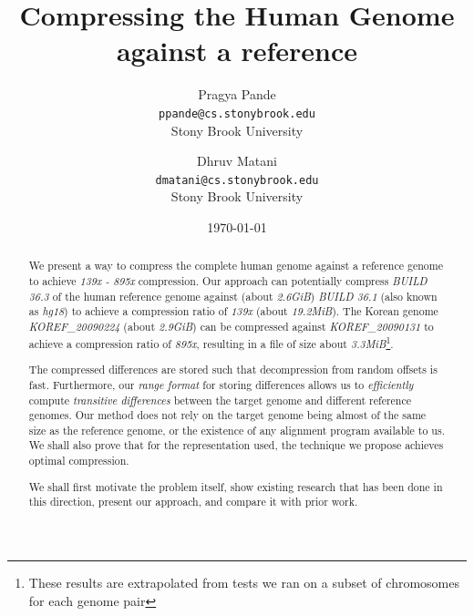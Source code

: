 \documentclass[11pt]{article}
\begin{document}
\title{Compressing the Human Genome against a reference}
\author{Pragya Pande\\\texttt{\small{ppande@cs.stonybrook.edu}}\\\small{Stony Brook University} \and 
  Dhruv Matani\\\texttt{\small{dmatani@cs.stonybrook.edu}}\\\small{Stony Brook University}
}
\date{\today}

\maketitle

\vspace{0.5in}

\begin{abstract}
  We present a way to compress the complete human genome against a
  reference genome to achieve \textit{139x - 895x} compression. Our
  approach can potentially compress \textit{BUILD 36.3} of the human
  reference genome against (about \textit{2.6GiB}) \textit{BUILD 36.1}
  (also known as \textit{hg18}) to achieve a compression ratio of
  \textit{139x} (about \textit{19.2MiB}). The Korean genome
  \textit{KOREF\_20090224} (about \textit{2.9GiB}) can be compressed
  against \textit{KOREF\_20090131} to achieve a compression ratio of
  \textit{895x}, resulting in a file of size about
  \textit{3.3MiB}\footnote{These results are extrapolated from tests
    we ran on a subset of chromosomes for each genome pair}.

  The compressed differences are stored such that decompression from
  random offsets is fast. Furthermore, our \textit{range format} for
  storing differences allows us to \textit{efficiently} compute
  \textit{transitive differences} between the target genome and
  different reference genomes. Our method does not rely on the target
  genome being almost of the same size as the reference genome, or the
  existence of any alignment program available to us. We shall also
  prove that for the representation used, the technique we propose
  achieves optimal compression.

  We shall first motivate the problem itself, show existing research
  that has been done in this direction, present our approach, and
  compare it with prior work.

\end{abstract}

\setlength{\parskip}{0.7ex plus 0.5ex minus 0.2ex}
\end{document}
